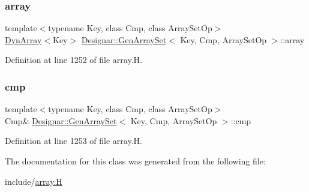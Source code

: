 \subsubsection{\texorpdfstring{array}{array}}
{\footnotesize\ttfamily template$<$typename Key, class Cmp, class Array\+Set\+Op$>$ \\
\hyperlink{class_designar_1_1_dyn_array}{Dyn\+Array}$<$Key$>$ \hyperlink{class_designar_1_1_gen_array_set}{Designar\+::\+Gen\+Array\+Set}$<$ Key, Cmp, Array\+Set\+Op $>$\+::array}



Definition at line 1252 of file array.\+H.

\mbox{\label{class_designar_1_1_gen_array_set_a2b1e3c653865a794eab7d19e43c1b0de}} 
\subsubsection{\texorpdfstring{cmp}{cmp}}
{\footnotesize\ttfamily template$<$typename Key, class Cmp, class Array\+Set\+Op$>$ \\
Cmp\& \hyperlink{class_designar_1_1_gen_array_set}{Designar\+::\+Gen\+Array\+Set}$<$ Key, Cmp, Array\+Set\+Op $>$\+::cmp}



Definition at line 1253 of file array.\+H.



The documentation for this class was generated from the following file\+:\begin{DoxyCompactItemize}
\item 
include/\hyperlink{array_8_h}{array.\+H}\end{DoxyCompactItemize}
